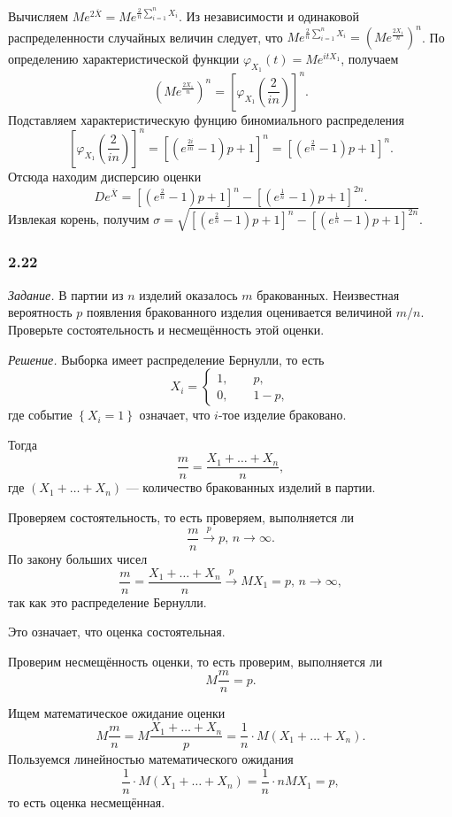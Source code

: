 Вычисляем $Me^{2 \overline{X}} = Me^{ \frac{2}{n} \sum \limits_{i = 1}^n X_i}$.
Из независимости и одинаковой распределенности случайных величин следует,
что $Me^{ \frac{2}{n} \sum \limits_{i = 1}^n X_i} = \left( Me^{ \frac{2X_1}{n}} \right)^n$.
По определению характеристической функции $ \varphi_{X_1} \left( t \right) = Me^{itX_1}$, получаем
$$ \left( Me^{ \frac{2X_1}{n}} \right)^n =
  \left[ \varphi_{X_1} \left( \frac{2}{in} \right) \right]^n.$$
Подставляем характеристическую фунцию биномиального распределения
$$ \left[ \varphi_{X_1} \left( \frac{2}{in} \right) \right]^n =
  \left[ \left( e^{ \frac{2i}{in}} - 1 \right) p + 1 \right]^n =
  \left[ \left( e^{ \frac{2}{n}} - 1 \right) p + 1 \right]^n.$$
Отсюда находим дисперсию оценки
$$De^{ \overline{X}} =
  \left[ \left( e^{ \frac{2}{n}} - 1 \right) p + 1 \right]^n -
  \left[ \left( e^{ \frac{1}{n}} - 1 \right) p + 1 \right]^{2n}.$$
Извлекая корень, получим
$ \sigma =
  \sqrt{
    \left[ \left( e^{ \frac{2}{n}} - 1 \right) p + 1 \right]^n -
    \left[ \left( e^{ \frac{1}{n}} - 1 \right) p + 1 \right]^{2n}
  }.$

\subsubsection*{2.22}

\textit{Задание.} В партии из $n$ изделий оказалось $m$ бракованных.
Неизвестная вероятность $p$ появления бракованного изделия оценивается величиной $m / n$.
Проверьте состоятельность и несмещённость этой оценки.

\textit{Решение.} Выборка имеет распределение Бернулли, то есть
$$X_i =
  \begin{cases}
    1, \qquad p, \\
    0, \qquad 1 - p,
  \end{cases}$$
где событие $ \left\{ X_i = 1 \right\} $ означает, что $i$-тое изделие браковано.

Тогда
$$ \frac{m}{n} =
  \frac{X_1 + \dotsc + X_n}{n},$$
где $ \left( X_1 + \dotsc + X_n \right) $ --- количество бракованных изделий в партии.

Проверяем состоятельность, то есть проверяем, выполняется ли
$$ \frac{m}{n} \overset{p}{ \to } p, \,
  n \to \infty.$$
По закону больших чисел
$$ \frac{m}{n} =
  \frac{X_1 + \dotsc + X_n}{n} \overset{p}{ \to }
  MX_1 =
  p, \,
  n \to \infty,$$
так как это распределение Бернулли.

Это означает, что оценка состоятельная.

Проверим несмещённость оценки, то есть проверим, выполняется ли
$$M \frac{m}{n} =
  p.$$

Ищем математическое ожидание оценки
$$M \frac{m}{n} =
  M \frac{X_1 + \dotsc + X_n}{p} =
  \frac{1}{n} \cdot M \left( X_1 + \dotsc + X_n \right).$$
Пользуемся линейностью математического ожидания
$$ \frac{1}{n} \cdot M \left( X_1 + \dotsc + X_n \right) =
  \frac{1}{n} \cdot nMX_1 =
  p,$$
то есть оценка несмещённая.
